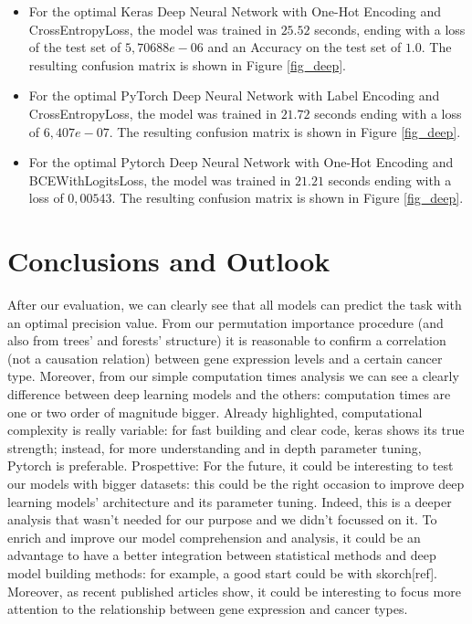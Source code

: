 \documentclass[12pt]{article}
\begin{document}
\begin{itemize}
\newpage
\item For the optimal Keras Deep Neural Network with One-Hot Encoding and CrossEntropyLoss, the model was trained in $25.52$ seconds, ending with a loss of the test set of $5,70688e-06$ and an Accuracy on the test set of $1.0$.
The resulting confusion matrix is shown in Figure \ref{fig_deep}. 

\item For the optimal PyTorch Deep Neural Network with Label Encoding and CrossEntropyLoss, the model was trained in $21.72$ seconds ending with a loss of $6,407e-07$. 
The resulting confusion matrix is shown in Figure \ref{fig_deep}.

\item For the optimal Pytorch Deep Neural Network with One-Hot Encoding and BCEWithLogitsLoss, the model was trained in $21.21$ seconds ending with a loss of $0,00543$. 
The resulting confusion matrix is shown in Figure \ref{fig_deep}.
\end{itemize}



\newpage
\section{Conclusions and Outlook}
After our evaluation, we can clearly see that all models can predict the task with an optimal precision value.
From our permutation importance procedure (and also from trees’ and forests’ structure) it is reasonable to confirm a correlation (not a causation relation) between gene expression levels and a certain cancer type.
Moreover, from our simple computation times analysis we can see a clearly difference between deep learning models and the others: computation times are one or two order of magnitude bigger.
Already highlighted, computational complexity is really variable: for fast building and clear code, keras shows its true strength; instead, for more understanding and in depth parameter tuning, Pytorch is preferable.
Prospettive:
For the future, it could be interesting to test our models with bigger datasets: this could be the right occasion to improve deep learning models’ architecture and its parameter tuning. Indeed, this is a deeper analysis that wasn’t needed for our purpose and we didn’t focussed on it.
To enrich and improve our model comprehension and analysis, it could be an advantage to have a better integration between statistical methods and deep model building methods: for example, a good start could be with skorch[ref].
Moreover, as recent published articles show, it could be interesting to focus more attention to the relationship between gene expression and cancer types.


\newpage


\end{document}
